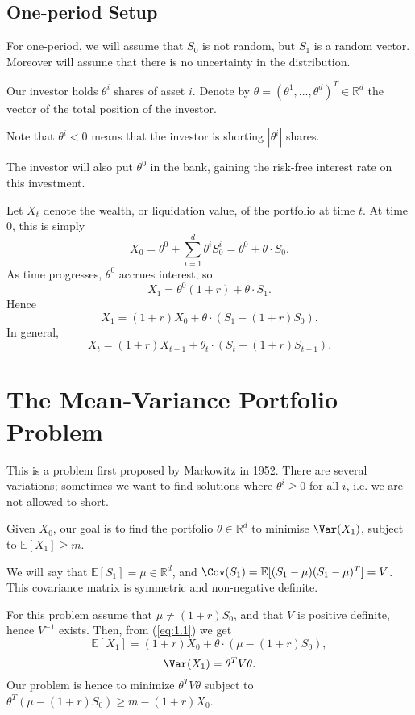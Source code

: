 \documentclass[12pt]{article}
\begin{document}
\subsection{One-period Setup}
\label{sub:one_period_setup}

For one-period, we will assume that $S_0$ is not random, but $S_1$ is a random vector. Moreover will assume that there is no uncertainty in the distribution.

Our investor holds $\theta^i$ shares of asset $i$. Denote by $\theta = (\theta^1, \ldots, \theta^d)^T \in \mathbb{R}^d$ the vector of the total position of the investor.

Note that $\theta^i < 0$ means that the investor is shorting $|\theta^i|$ shares.

The investor will also put $\theta^0$ in the bank, gaining the risk-free interest rate on this investment.

Let $X_t$ denote the wealth, or liquidation value, of the portfolio at time $t$. At time $0$, this is simply
\[
X_0 = \theta^0 + \sum_{i=1}^{d} \theta^i S^i_0 = \theta^0 + \theta \cdot S_0.
\]
As time progresses, $\theta^0$ accrues interest, so
\[
X_1 = \theta^0 (1+r) + \theta \cdot S_1.
\]
Hence
\[
	X_1 = (1+r)X_0 + \theta \cdot (S_1 - (1+r) S_0). \tag{1.1}\label{eq:1.1}
\]
In general,
\[
	X_t = (1+r)X_{t-1} + \theta_t \cdot (S_t - (1+r)S_{t-1}). \tag{1.2}\label{eq:1.2}
\]

\newpage

\section{The Mean-Variance Portfolio Problem}
\label{sec:mv_problem}

This is a problem first proposed by Markowitz in 1952. There are several variations; sometimes we want to find solutions where $\theta^i \geq 0$ for all $i$, i.e. we are not allowed to short.

Given $X_0$, our goal is to find the portfolio $\theta \in \mathbb{R}^{d}$ to minimise $\Var(X_1)$, subject to $\mathbb{E}[X_1] \ge m$.

We will say that $\mathbb{E}[S_1] = \mu \in \mathbb{R}^{d}$, and $\Cov(S_1) = \mathbb{E}[(S_1 - \mu)(S_1 - \mu)^T] = V$. This covariance matrix is symmetric and non-negative definite.

For this problem assume that $\mu \neq (1+r)S_0$, and that $V$ is positive definite, hence $V^{-1}$ exists. Then, from (\ref{eq:1.1}) we get
\[
\mathbb{E}[X_1] = (1+r)X_0 + \theta \cdot (\mu - (1+r)S_0),
\]
\[
\Var(X_1) = \theta^{T} V \theta.
\]
Our problem is hence to minimize $\theta^T V \theta$ subject to $\theta^T (\mu - (1+r)S_0) \ge m - (1+r)X_0$.
\end{document}

